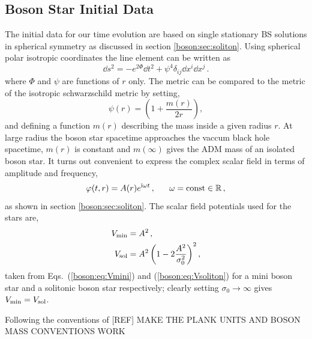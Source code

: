 \subsection{Boson Star Initial Data}
%
The initial data for our time evolution are based on single stationary
BS solutions in spherical symmetry as discussed in section \ref{boson:sec:soliton}.
Using spherical polar isotropic coordinates the
line element can be written as
%
\begin{equation}
  \dd s^2 =
  -e^{2\Phi} \dd t^2
  + \psi^4 \delta_{ij} \dd x^i \dd x^j\,.
  \label{mal:eq:ds2sym}
\end{equation}
%
where $\Phi$ and $\psi$ are functions of $r$ only. The metric can be compared to the metric of the isotropic schwarzschild metric by setting,
\begin{equation}
\psi(r) = \left(1+\frac{m(r)}{2 r} \right),
\end{equation} 
and defining a function $m(r)$ describing the mass inside a given radius $r$. At large radius the boson star spacetime approaches the vaccum black hole spacetime, $m(r)$ is constant and $m(\infty)$ gives the ADM mass of an isolated boson star.
It turns out convenient to express the complex
scalar field in terms of amplitude and frequency,
%
\begin{equation}
  \varphi(t,r) =
  A(r)
  e^{{\rm i} \omega t}\,,~~~~~\omega = \mathrm{const}\in \mathbb{R}\,,
\end{equation}
as shown in section \ref{boson:sec:soliton}. The scalar field potentials used for the stars are,
\begin{align}
  {V}_{\rm min} &= {A}^2\,,~~~~~~~~~~ \label{mal:eq:Vmini} \\
  {V}_{\rm sol} &= {A}^2 \left( 1-2\frac{{A}^2}{{\sigma}_0^2} \right)^2, \label{mal:eq:Vsoliton} 
\end{align}
taken from Eqs.~(\ref{boson:eq:Vmini}) and (\ref{boson:eq:Vsoliton}) for a mini boson star and a solitonic boson star respectively; clearly setting $\sigma_0 \rightarrow \infty$ gives $V_{\rm min} = V_{\rm sol}$.


Following the conventions of [REF] MAKE THE PLANK UNITS AND BOSON MASS CONVENTIONS WORK


